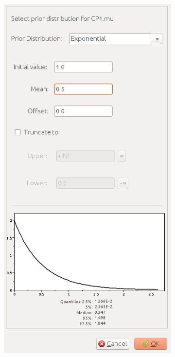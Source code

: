 {    \begin{figure}[htbp]
        \centering
        \begin{subfigure}[b]{0.3\textwidth}
            \includegraphics[width=\textwidth]{../screenshots/beauti-prior-cp1mu.jpg}

\end{subfigure}
\end{figure}}
